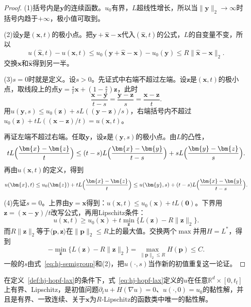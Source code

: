 \begin{proof}
(1)括号内是$\bm{y}$的连续函数。$u_0$有界，$L$超线性增长，所以当$\lVert\bm{y}\rVert_2\to\infty$时括号内趋于$+\infty$，极小值可取到。

(2)设$\bm{y}$是$(\bm{x},t)$的极小点。把$\bm{y}+\hat{\bm{x}}-\bm{x}$代入$(\hat{\bm{x}},t)$的公式，$L$的自变量不变，所以
\[
  u(\hat{\bm{x}},t)-u(\bm{x},t)\leq u_0(\bm{y}+\hat{\bm{x}}-\bm{x})-u_0(\bm{y})\leq R\lVert\hat{\bm{x}}-\bm{x}\rVert_2.
\]
交换$\bm{x}$和$\hat{\bm{x}}$得到另一半。

(3)$s=0$时就是定义。设$s>0$。先证式中右端不超过左端。设$\bm{z}$是$(\bm{x},t)$的极小点，取线段上的点$\bm{y}=\frac{s}{t}\bm{x}+(1-\frac{s}{t})\bm{z}$，此时
\[
  \frac{\bm{x}-\bm{y}}{t-s}=\frac{\bm{y}-\bm{z}}{s}=\frac{\bm{x}-\bm{z}}{t}.
\]
用$u(\bm{y},s)\leq u_0(\bm{z})+sL((\bm{y}-\bm{z})/s)$，右端括号内不超过$u_0(\bm{z})+tL((\bm{x}-\bm{z})/t)=u(\bm{x},t)$。

再证左端不超过右端。任取$\bm{y}$，设$\bm{z}$是$(\bm{y},s)$的极小点。由$L$的凸性，
\[
  tL\Bigl(\frac{\bm{x}-\bm{z}}{t}\Bigr)\leq(t-s)L\Bigl(\frac{\bm{x}-\bm{y}}{t-s}\Bigr)+sL\Bigl(\frac{\bm{y}-\bm{z}}{s}\Bigr).
\]
再由$u(\bm{x},t)$的定义，得到
\[
  u(\bm{x},t)\leq u_0(\bm{z})+tL\Bigl(\frac{\bm{x}-\bm{z}}{t}\Bigr)\leq u(\bm{y},s)+(t-s)L\Bigl(\frac{\bm{x}-\bm{y}}{t-s}\Bigr).
\]

(4)先证$s=0$。上界由$\bm{y}=\bm{x}$得到：$u(\bm{x},t)\leq u_0(\bm{x})+tL(\bm{0})$。下界用$\bm{z}=(\bm{x}-\bm{y})/t$改写公式，再用Lipschitz条件：
\[
  u(\bm{x},t)\geq u_0(\bm{x})+t\min_{\bm{z}}\bigl\{L(\bm{z})-R\lVert\bm{z}\rVert_2\bigr\}.
\]
而$R\lVert\bm{z}\rVert_2$等于$\langle\bm{p},\bm{z}\rangle$在$\lVert\bm{p}\rVert_2\leq R$上的最大值。交换两个$\max$并用$H=L^*$，得到
\[
  -\min_{\bm{z}}\bigl\{L(\bm{z})-R\lVert\bm{z}\rVert_2\bigr\}=\max_{\lVert\bm{p}\rVert_2\leq R}H(\bm{p})\leq C.
\]
一般的$s$由式~\eqref{eq:hj-semigroup}和(2)，把$u(\cdot,s)$当作新的初值重复这一论证。
\end{proof}

\begin{theorem}
\label{thm:hj-hopf-lax}
在定义~\ref{def:hj-hopf-lax}的条件下，式~\eqref{eq:hj-hopf-lax}定义的$u$在任意$\mathbb{R}^{d}\times[0,t_{\mathrm{f}}]$上有界、Lipschitz，是初值问题$\partial_tu+H(\nabla u)=0$、$u(\cdot,0)=u_0$的黏性解，并且是有界、一致连续、关于$\bm{x}$为$R$-Lipschitz的函数类中唯一的黏性解。
\end{theorem}

